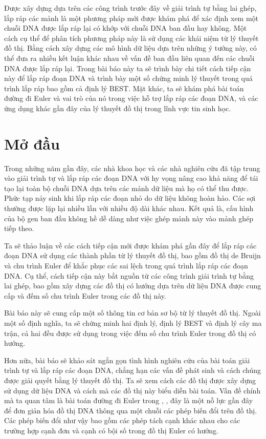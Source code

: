 \documentclass[14pt, a4paper]{article}
\numberwithin{equation}{section}
\numberwithin{figure}{section}
\numberwithin{dl}{section}
\numberwithin{md}{section}
\numberwithin{bd}{section}
\numberwithin{dn}{section}
\numberwithin{hq}{section}
\begin{document}
    Được xây dựng dựa trên các công trình trước đây về giải trình tự bằng lai ghép, lắp ráp các mảnh là một phương pháp mới được khám phá để xác định xem một chuỗi DNA được lắp ráp lại có khớp với chuỗi DNA ban đầu hay không.
    Một cách cụ thể để phân tích phương pháp này là sử dụng các khái niệm từ lý thuyết đồ thị.
    Bằng cách xây dựng các mô hình dữ liệu dựa trên những ý tưởng này, có thể đưa ra nhiều kết luận khác nhau về vấn đề ban đầu liên quan đến các chuỗi DNA được lắp ráp lại.
    Trong bài báo này ta sẽ trình bày chi tiết cách tiếp cận này để lắp ráp đoạn DNA và trình bày một số chứng minh lý thuyết trong quá trình lắp ráp bao gồm cả định lý BEST.
    Mặt khác, ta sẽ khám phá bài toán đường đi Euler và vai trò của nó trong việc hỗ trợ lắp ráp các đoạn DNA, và các ứng dụng khác gần đây của lý thuyết đồ thị trong lĩnh vực tin sinh học.

    \newpage
    \section{Mở đầu}
    
    Trong những năm gần đây, các nhà khoa học và các nhà nghiên cứu đã tập trung vào giải trình tự và lắp ráp các đoạn DNA với hy vọng nâng cao khả năng để tái tạo lại toàn bộ chuỗi DNA dựa trên các mảnh dữ liệu mà họ có thể thu được.
    Phức tạp nảy sinh khi lắp ráp các đoạn nhỏ do dữ liệu không hoàn hảo.
    Các sợi thường được lặp lại nhiều lần với nhiều độ dài khác nhau.
    Kết quả là, cấu hình của bộ gen ban đầu không hề dễ dàng như việc ghép mảnh này vào mảnh ghép tiếp theo.

    Ta sẽ thảo luận về các cách tiếp cận mới được khám phá gần đây để lắp ráp các đoạn DNA sử dụng các thành phần từ lý thuyết đồ thị,
    bao gồm đồ thị de Bruijn và chu trình Euler để khắc phục các sai lệch trong quá trình lắp ráp các đoạn DNA.
    Cụ thể, cách tiếp cận này bắt nguồn từ các công trình giải trình tự bằng lai ghép, bao gồm xây dựng các đồ thị có hướng dựa trên dữ liệu DNA được cung cấp và đếm số chu trình Euler trong các đồ thị này.

    Bài báo này sẽ cung cấp một số thông tin cơ bản sơ bộ từ lý thuyết đồ thị.
    Ngoài một số định nghĩa, ta sẽ chứng minh hai định lý, định lý BEST và định lý cây ma trận, cả hai đều được sử dụng trong việc đếm số chu trình Euler trong đồ thị có hướng.

    Hơn nữa, bài báo sẽ khảo sát ngắn gọn tình hình nghiên cứu của bài toán giải trình tự và lắp ráp các đoạn DNA,
    chẳng hạn các vấn đề phát sinh và cách chúng được giải quyết bằng lý thuyết đồ thị.
    Ta sẽ xem cách các đồ thị được xây dựng sử dụng dữ liệu DNA và cách mà các đồ thị này biểu diễn bài toán.
    Vấn đề chính mà ta quan tâm là bài toán đường đi Euler trong \cite{pevzner2001eulerian}, \cite{pevzner2001new}, đây là một nỗ lực gần đây để đơn giản hóa đồ thị DNA thông qua một chuỗi các phép biến đổi trên đồ thị.
    Các phép biến đổi như vậy bao gồm các phép tách cạnh khác nhau cho các trường hợp cạnh đơn và cạnh có bội số trong đồ thị Euler có hướng.
\end{document}
